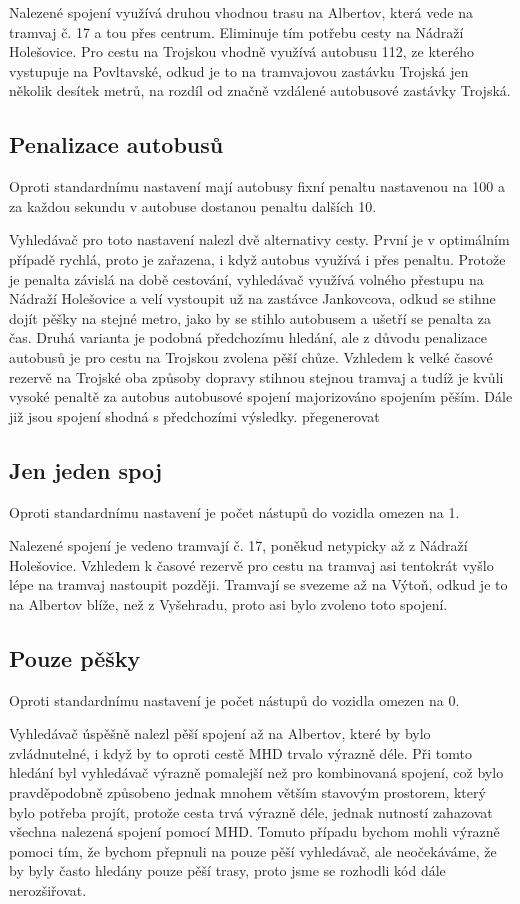 Nalezené spojení využívá druhou vhodnou trasu na Albertov, která vede na tramvaj
č. 17 a tou přes centrum. Eliminuje tím potřebu cesty na Nádraží Holešovice.
Pro cestu na Trojskou vhodně využívá autobusu 112, ze kterého vystupuje na
Povltavské, odkud je to na tramvajovou zastávku Trojská jen několik desítek
metrů, na rozdíl od značně vzdálené autobusové zastávky Trojská.

\subsection{Penalizace autobusů}
Oproti standardnímu nastavení mají autobusy fixní penaltu nastavenou na 100 a za
každou sekundu v autobuse dostanou penaltu dalších 10. 

Vyhledávač pro toto nastavení nalezl dvě alternativy cesty. První je v
optimálním případě rychlá, proto je zařazena, i když autobus využívá i přes
penaltu. Protože je penalta závislá na době cestování, vyhledávač využívá
volného přestupu na Nádraží Holešovice a velí vystoupit už na zastávce
Jankovcova, odkud se stihne dojít pěšky na stejné metro, jako by se stihlo
autobusem a ušetří se penalta za čas. Druhá varianta je podobná předchozímu
hledání, ale z důvodu penalizace autobusů je pro cestu na Trojskou zvolena pěší
chůze. Vzhledem k velké časové rezervě na Trojské oba způsoby dopravy stihnou
stejnou tramvaj a tudíž je kvůli vysoké penaltě za autobus autobusové spojení
majorizováno spojením pěším. Dále již jsou spojení shodná s předchozími
výsledky.
\TODO přegenerovat

\subsection{Jen jeden spoj}
Oproti standardnímu nastavení je počet nástupů do vozidla omezen na 1.

Nalezené spojení je vedeno tramvají č. 17, poněkud netypicky až z Nádraží
Holešovice. Vzhledem k časové rezervě pro cestu na tramvaj asi tentokrát vyšlo
lépe na tramvaj nastoupit později. Tramvají se svezeme až na Výtoň, odkud je to
na Albertov blíže, než z Vyšehradu, proto asi bylo zvoleno toto spojení. 
\subsection{Pouze pěšky}
Oproti standardnímu nastavení je počet nástupů do vozidla omezen na 0.

Vyhledávač úspěšně nalezl pěší spojení až na Albertov, které by bylo
zvládnutelné, i když by to oproti cestě MHD trvalo výrazně déle. Při tomto
hledání byl vyhledávač výrazně pomalejší než pro kombinovaná spojení, což bylo
pravděpodobně způsobeno jednak mnohem větším stavovým prostorem, který bylo
potřeba projít, protože cesta trvá výrazně déle, jednak nutností zahazovat
všechna nalezená spojení pomocí MHD. Tomuto případu bychom mohli výrazně pomoci
tím, že bychom přepnuli na pouze pěší vyhledávač, ale neočekáváme, že by byly
často hledány pouze pěší trasy, proto jsme se rozhodli kód dále nerozšiřovat.
